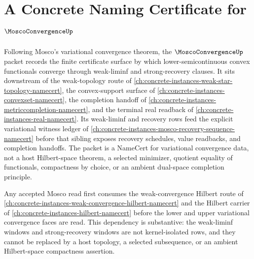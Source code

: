 \chapter{A Concrete Naming Certificate for $\MoscoConvergenceUp$}
\label{ch:concrete-instances-mosco-convergence-namecert}

Following Mosco's variational convergence theorem, the $\MoscoConvergenceUp$ packet records the finite certificate surface by which lower-semicontinuous convex functionals converge through weak-liminf and strong-recovery clauses. It sits downstream of the weak-topology route of \autoref{ch:concrete-instances-weak-star-topology-namecert}, the convex-support surface of \autoref{ch:concrete-instances-convexset-namecert}, the completion handoff of \autoref{ch:concrete-instances-metriccompletion-namecert}, and the terminal real readback of \autoref{ch:concrete-instances-real-namecert}. Its weak-liminf and recovery rows feed the explicit variational witness ledger of \autoref{ch:concrete-instances-mosco-recovery-sequence-namecert} before that sibling exposes recovery schedules, value readbacks, and completion handoffs. The packet is a NameCert for variational convergence data, not a host Hilbert-space theorem, a selected minimizer, quotient equality of functionals, compactness by choice, or an ambient dual-space completion principle.

Any accepted Mosco read first consumes the weak-convergence Hilbert route of \autoref{ch:concrete-instances-weak-convergence-hilbert-namecert} and the Hilbert carrier of \autoref{ch:concrete-instances-hilbert-namecert} before the lower and upper variational convergence faces are read. This dependency is substantive: the weak-liminf windows and strong-recovery windows are not kernel-isolated rows, and they cannot be replaced by a host topology, a selected subsequence, or an ambient Hilbert-space compactness assertion.

